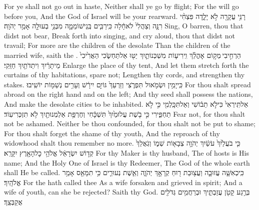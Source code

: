 {For ye shall not go out in haste, Neither shall ye go by flight; For the \lord\space will go before you, And the God of Israel will be your rearward.}
\newperek
{}
\label{haft_49}
\setcounter{chap}{54}
\setcounter{verse}{1}
{רָנִּ֥י עֲקָרָ֖ה לֹ֣א יָלָ֑דָה פִּצְחִ֨י רִנָּ֤ה וְצַהֲלִי֙ לֹא\maqqaf חָ֔לָה כִּֽי\maqqaf רַבִּ֧ים בְּֽנֵי\maqqaf שׁוֹמֵמָ֛ה מִבְּנֵ֥י בְעוּלָ֖ה אָמַ֥ר יְהֹוָֽה׃}
{Sing, O barren, thou that didst not bear, Break forth into singing, and cry aloud, thou that didst not travail; For more are the children of the desolate Than the children of the married wife, saith the \lord.}
{הַרְחִ֣יבִי \legarmeh  מְק֣וֹם אׇהֳלֵ֗ךְ וִֽירִיע֧וֹת מִשְׁכְּנוֹתַ֛יִךְ יַטּ֖וּ אַל\maqqaf תַּחְשֹׂ֑כִי הַאֲרִ֙יכִי֙ מֵיתָרַ֔יִךְ וִיתֵדֹתַ֖יִךְ חַזֵּֽקִי׃}
{Enlarge the place of thy tent, And let them stretch forth the curtains of thy habitations, spare not; Lengthen thy cords, and strengthen thy stakes.}
{כִּֽי\maqqaf יָמִ֥ין וּשְׂמֹ֖אול תִּפְרֹ֑צִי וְזַרְעֵךְ֙ גּוֹיִ֣ם יִירָ֔שׁ וְעָרִ֥ים נְשַׁמּ֖וֹת יוֹשִֽׁיבוּ׃}
{For thou shalt spread abroad on the right hand and on the left; And thy seed shall possess the nations, And make the desolate cities to be inhabited.}
{אַל\maqqaf תִּֽירְאִי֙ כִּי\maqqaf לֹ֣א תֵב֔וֹשִׁי וְאַל\maqqaf תִּכָּֽלְמִ֖י כִּ֣י לֹ֣א תַחְפִּ֑ירִי כִּ֣י בֹ֤שֶׁת עֲלוּמַ֙יִךְ֙ תִּשְׁכָּ֔חִי וְחֶרְפַּ֥ת אַלְמְנוּתַ֖יִךְ לֹ֥א תִזְכְּרִי\maqqaf עֽוֹד׃}
{Fear not, for thou shalt not be ashamed. Neither be thou confounded, for thou shalt not be put to shame; For thou shalt forget the shame of thy youth, And the reproach of thy widowhood shalt thou remember no more.}
{כִּ֤י בֹעֲלַ֙יִךְ֙ עֹשַׂ֔יִךְ יְהֹוָ֥ה צְבָא֖וֹת שְׁמ֑וֹ וְגֹֽאֲלֵךְ֙ קְד֣וֹשׁ יִשְׂרָאֵ֔ל אֱלֹהֵ֥י כׇל\maqqaf הָאָ֖רֶץ יִקָּרֵֽא׃}
{For thy Maker is thy husband, The \lord\space of hosts is His name; And the Holy One of Israel is thy Redeemer, The God of the whole earth shall He be called.}
{כִּֽי\maqqaf כְאִשָּׁ֧ה עֲזוּבָ֛ה וַעֲצ֥וּבַת ר֖וּחַ קְרָאָ֣ךְ יְהֹוָ֑ה וְאֵ֧שֶׁת נְעוּרִ֛ים כִּ֥י תִמָּאֵ֖ס אָמַ֥ר אֱלֹהָֽיִךְ׃}
{For the \lord\space hath called thee As a wife forsaken and grieved in spirit; And a wife of youth, can she be rejected? Saith thy God.}
{בְּרֶ֥גַע קָטֹ֖ן עֲזַבְתִּ֑יךְ וּבְרַחֲמִ֥ים גְּדֹלִ֖ים אֲקַבְּצֵֽךְ׃}
